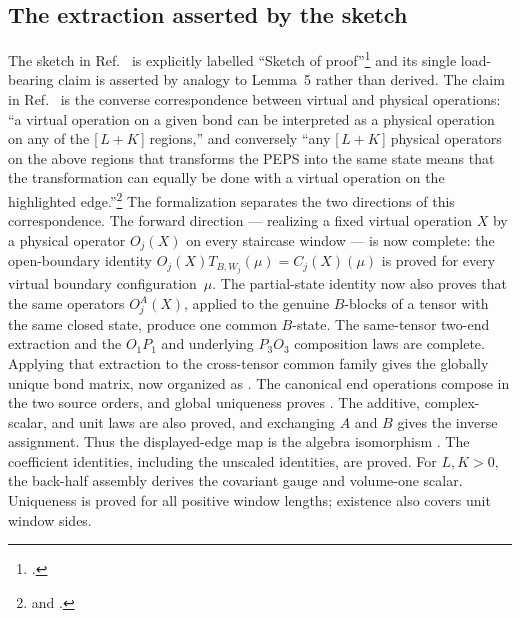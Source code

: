 \documentclass{article}
\begin{document}
\subsection{The extraction asserted by the sketch}

The sketch in Ref.~\cite{Molnar2018NormalPEPS} is explicitly labelled
``Sketch of proof''\footnote{.} and its
single load-bearing claim is asserted by analogy to Lemma~5 rather than
derived. The claim in Ref.~\cite{Molnar2018NormalPEPS} is the converse
correspondence between virtual and physical operations: ``a virtual
operation on a given bond can be
interpreted as a physical operation on any of the [\,$L+K$\,] regions,'' and
conversely ``any [\,$L+K$\,] physical operators on the above regions that
transforms the PEPS into the same state means that the transformation can
equally be done with a virtual operation on the highlighted
edge.''\footnote{ and
    .} The formalization separates
the two directions of this correspondence.  The forward direction ---
realizing a fixed virtual operation $X$ by a physical operator $O_j(X)$ on
every staircase window --- is now complete: the open-boundary identity
$O_j(X)T_{B,W_j}(\mu)=C_j(X)(\mu)$ is proved for every virtual boundary
configuration~$\mu$.  The partial-state identity now also proves that the
same operators $O_j^A(X)$, applied to the genuine $B$-blocks of a tensor with
the same closed state, produce one common $B$-state.  The same-tensor two-end
extraction and the $O_1P_1$ and underlying $P_3O_3$ composition laws are
complete.  Applying that extraction to the cross-tensor common family gives
the globally unique bond matrix, now organized as
.  The canonical end
operations compose in the two source orders, and global uniqueness proves
.  The additive, complex-scalar, and unit laws are also proved, and exchanging
$A$ and $B$ gives the inverse assignment. Thus the displayed-edge map is the
algebra isomorphism . The
coefficient identities, including the unscaled identities, are proved.
For $L,K>0$, the back-half assembly derives the covariant gauge and
volume-one scalar. Uniqueness is proved for all positive window lengths;
existence also covers unit window sides.
\end{document}
